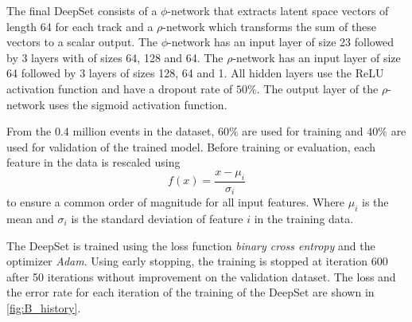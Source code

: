 The final DeepSet consists of a $\phi$-network that extracts latent space vectors of length 64 for each track and a $\rho$-network which transforms the sum of these vectors to a scalar output.
The $\phi$-network has an input layer of size 23 followed by 3 layers with of sizes 64, 128 and 64.
The $\rho$-network has an input layer of size 64 followed by 3 layers of sizes 128, 64 and 1.
All hidden layers use the ReLU activation function and have a dropout rate of $50\%$.
The output layer of the $\rho$-network uses the sigmoid activation function.

From the $0.4$ million events in the dataset, $60\%$ are used for training and $40\%$ are used for validation of the trained model.
Before training or evaluation, each feature in the data is rescaled using 
\begin{equation}
    f(x) = \frac{x - \mu_i}{\sigma_i} 
\end{equation} 
to ensure a common order of magnitude for all input features.
Where $\mu_i$ is the mean and $\sigma_i$ is the standard deviation of feature $i$ in the training data.

The DeepSet is trained using the loss function \emph{binary cross entropy} and the optimizer \emph{Adam}.
Using early stopping, the training is stopped at iteration 600 after 50 iterations without improvement on the validation dataset.
The loss and the error rate for each iteration of the training of the DeepSet are shown in \cref{fig:B_history}.


